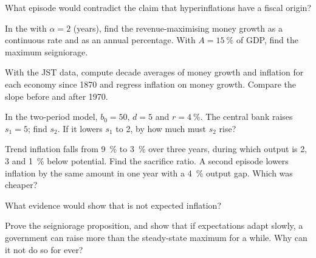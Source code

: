 \begin{exercise}[$\star$]\label{exo:b3:inflation-evidence:4}
What episode would contradict the claim that hyperinflations have a fiscal
origin?
\end{exercise}

\begin{exercise}[$\star\star$]\label{exo:b3:inflation-evidence:5}
In the  with $\alpha = 2$ (years), find the revenue-maximising money growth as a
continuous rate and as an annual percentage. With $A = 15~\%$ of GDP, find the maximum
seigniorage.
\end{exercise}

\begin{exercise}[$\star\star$]\label{exo:b3:inflation-evidence:6}
With the JST data, compute decade averages of money growth and inflation for each
economy since 1870 and regress inflation on money growth. Compare the slope before
and after 1970.
\end{exercise}

\begin{exercise}[$\star\star$]\label{exo:b3:inflation-evidence:7}
In the two-period model, $b_0 = 50$, $d = 5$ and $r = 4~\%$. The central bank raises
$s_1 = 5$; find $s_2$. If it lowers $s_1$ to 2, by how much must $s_2$ rise?
\end{exercise}

\begin{exercise}[$\star\star$]\label{exo:b3:inflation-evidence:8}
Trend inflation falls from 9~\% to 3~\% over three years, during which output is 2, 3
and 1~\% below potential. Find the sacrifice ratio. A second episode lowers inflation
by the same amount in one year with a 4~\% output gap. Which was cheaper?
\end{exercise}

\begin{exercise}[$\star\star$]\label{exo:b3:inflation-evidence:9}
What evidence would show that  is not expected inflation?
\end{exercise}

\begin{exercise}[$\star\star\star$]\label{exo:b3:inflation-evidence:10}
Prove the seigniorage proposition, and show that if expectations adapt slowly, a
government can raise more than the steady-state maximum for a while. Why can it not
do so for ever?
\end{exercise}

